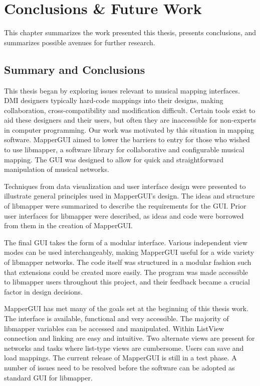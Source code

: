 \chapter{Conclusions \& Future Work}

This chapter summarizes the work presented this thesis, presents conclusions, and summarizes possible avenues for further research.

\section{Summary and Conclusions}

This thesis began by exploring issues relevant to musical mapping interfaces. DMI designers typically hard-code mappings into their designs, making collaboration, cross-compatibility and modification difficult. Certain tools exist to aid these designers and their users, but often they are inaccessible for non-experts in computer programming. Our work was motivated by this situation in mapping software. MapperGUI aimed to lower the barriers to entry for those who wished to use libmapper, a software library for collaborative and configurable musical mapping. The GUI was designed to allow for quick and straightforward manipulation of musical networks. 

Techniques from data visualization and user interface design were presented to illustrate general principles used in MapperGUI's design. The ideas and structure of libmapper were summarized to describe the requirements for the GUI. Prior user interfaces for libmapper were described, as ideas and code were borrowed from them in the creation of MapperGUI.

The final GUI takes the form of a modular interface. Various independent view modes can be used interchangeably, making MapperGUI useful for a wide variety of libmapper networks. The code itself was structured in a modular fashion such that extensions could be created more easily. The program was made accessible to libmapper users throughout this project, and their feedback became a crucial factor in design decisions. 

MapperGUI has met many of the goals set at the beginning of this thesis work. The interface is available, functional and very accessible. The majority of libmapper variables can be accessed and manipulated. Within ListView connection and linking are easy and intuitive. Two alternate views are present for networks and tasks where list-type views are cumbersome. Users can save and load mappings. The current release of MapperGUI is still in a test phase. A number of issues need to be resolved before the software can be adopted as standard GUI for libmapper. 

